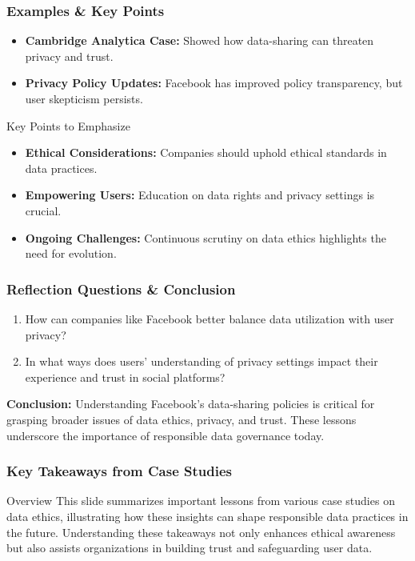 \documentclass[aspectratio=169]{beamer}
\begin{document}
\begin{frame}[fragile]
    \frametitle{Examples & Key Points}
    \begin{itemize}
        \item \textbf{Cambridge Analytica Case:} Showed how data-sharing can threaten privacy and trust.
        \item \textbf{Privacy Policy Updates:} Facebook has improved policy transparency, but user skepticism persists.
    \end{itemize}

    \begin{block}{Key Points to Emphasize}
        \begin{itemize}
            \item \textbf{Ethical Considerations:} Companies should uphold ethical standards in data practices.
            \item \textbf{Empowering Users:} Education on data rights and privacy settings is crucial.
            \item \textbf{Ongoing Challenges:} Continuous scrutiny on data ethics highlights the need for evolution.
        \end{itemize}
    \end{block}
\end{frame}

\begin{frame}[fragile]
    \frametitle{Reflection Questions & Conclusion}
    \begin{enumerate}
        \item How can companies like Facebook better balance data utilization with user privacy?
        \item In what ways does users' understanding of privacy settings impact their experience and trust in social platforms?
    \end{enumerate}

    \textbf{Conclusion:} Understanding Facebook's data-sharing policies is critical for grasping broader issues of data ethics, privacy, and trust. These lessons underscore the importance of responsible data governance today.
\end{frame}

\begin{frame}[fragile]
    \frametitle{Key Takeaways from Case Studies}
    \begin{block}{Overview}
        This slide summarizes important lessons from various case studies on data ethics, illustrating how these insights can shape responsible data practices in the future. Understanding these takeaways not only enhances ethical awareness but also assists organizations in building trust and safeguarding user data.
    \end{block}
\end{frame}
\end{document}

